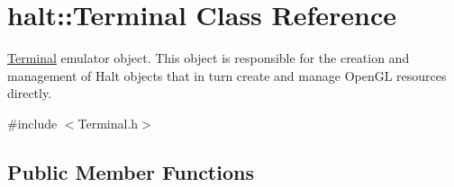 \hypertarget{classhalt_1_1_terminal}{\section{halt\-:\-:\-Terminal \-Class \-Reference}
\label{classhalt_1_1_terminal}
}


\hyperlink{classhalt_1_1_terminal}{\-Terminal} emulator object. \-This object is responsible for the creation and management of \-Halt objects that in turn create and manage \-Open\-G\-L resources directly.  




{\ttfamily \#include $<$\-Terminal.\-h$>$}

\subsection*{\-Public \-Member \-Functions}

